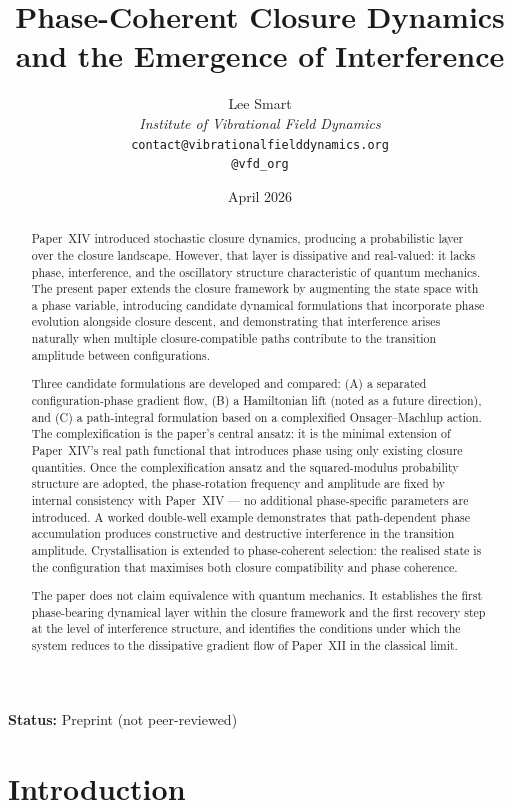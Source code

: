 \documentclass[12pt]{article}
\title{Phase-Coherent Closure Dynamics\\and the Emergence of Interference}
\author{%
  Lee Smart\\[4pt]
  \textit{Institute of Vibrational Field Dynamics}\\[2pt]
  \texttt{contact@vibrationalfielddynamics.org}\\[2pt]
  \texttt{@vfd\_org}%
}
\date{April 2026}
\begin{document}
\maketitle

\noindent\textbf{Status:} Preprint (not peer-reviewed)

\begin{abstract}
Paper~XIV introduced stochastic closure dynamics, producing a probabilistic layer over the closure landscape. However, that layer is dissipative and real-valued: it lacks phase, interference, and the oscillatory structure characteristic of quantum mechanics. The present paper extends the closure framework by augmenting the state space with a phase variable, introducing candidate dynamical formulations that incorporate phase evolution alongside closure descent, and demonstrating that interference arises naturally when multiple closure-compatible paths contribute to the transition amplitude between configurations.

Three candidate formulations are developed and compared: (A) a separated configuration-phase gradient flow, (B) a Hamiltonian lift (noted as a future direction), and (C) a path-integral formulation based on a complexified Onsager--Machlup action. The complexification is the paper's central ansatz: it is the minimal extension of Paper~XIV's real path functional that introduces phase using only existing closure quantities. Once the complexification ansatz and the squared-modulus probability structure are adopted, the phase-rotation frequency and amplitude are fixed by internal consistency with Paper~XIV --- no additional phase-specific parameters are introduced. A worked double-well example demonstrates that path-dependent phase accumulation produces constructive and destructive interference in the transition amplitude. Crystallisation is extended to phase-coherent selection: the realised state is the configuration that maximises both closure compatibility and phase coherence.

The paper does not claim equivalence with quantum mechanics. It establishes the first phase-bearing dynamical layer within the closure framework and the first recovery step at the level of interference structure, and identifies the conditions under which the system reduces to the dissipative gradient flow of Paper~XII in the classical limit.
\end{abstract}

\section{Introduction}\label{sec:intro}
\end{document}
